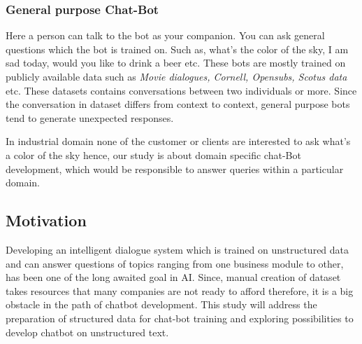 \documentclass[a4paper,12pt]{article}
\begin{document}
\subsubsection{General purpose Chat-Bot} 
Here a person can talk to the bot as your companion. You can ask general questions which the bot is trained on. Such as, what's the color of the sky, I am sad today, would you like to drink a beer etc. These bots are mostly trained on publicly available data such as  \textit{Movie dialogues, Cornell, Opensubs, Scotus data} etc. These datasets contains conversations between two individuals or more. Since the conversation in dataset differs from context to context, general purpose bots tend to generate unexpected responses.
\bigskip

In industrial domain none of the customer or clients are interested to ask what's a color of the sky hence, our study is about domain specific chat-Bot development, which would be responsible to answer queries within a particular domain.



\subsection{Motivation}
Developing an intelligent dialogue system which is trained on unstructured data and can answer questions of topics ranging from one business module to other, has been one of the long awaited goal in AI. Since, manual creation of dataset takes resources that many companies are not ready to afford therefore, it is a big obstacle in the path of chatbot development. This study will address the  preparation of structured data for chat-bot training and exploring possibilities to develop chatbot on unstructured text. 
\bigskip
\end{document}
